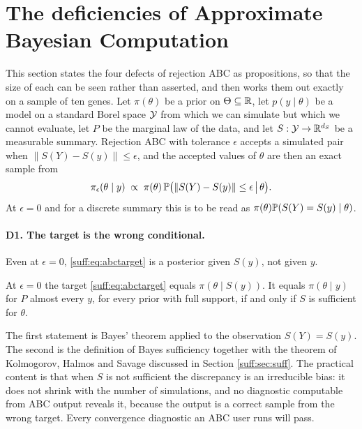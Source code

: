 \section{The deficiencies of Approximate Bayesian Computation}
\label{suff:sec:abc}

This section states the four defects of rejection ABC as propositions, so that the size of
each can be seen rather than asserted, and then works them out exactly on a sample of ten
genes. Let $\pi(\theta)$ be a prior on $\Theta\subseteq\mathbb{R}$, let $p(y\mid\theta)$ be a model on a
standard Borel space $\mathcal{Y}$ from which we can simulate but which we cannot evaluate, let $P$ be the marginal law of the data, and let
$S:\mathcal{Y}\to\mathbb{R}^{d_S}$ be a measurable summary. Rejection ABC with tolerance $\epsilon$ accepts
a simulated pair when $\|S(Y)-S(y)\|\le\epsilon$, and the accepted values of $\theta$ are
then an exact sample from
\begin{equation}
\pi_\epsilon(\theta\mid y) \;\propto\; \pi(\theta)\,
\mathbb{P}\big(\|S(Y)-S(y)\|\le\epsilon \,\big|\, \theta\big).
\label{suff:eq:abctarget}
\end{equation}
At $\epsilon=0$ and for a discrete summary this is to be read as
$\pi(\theta)\mathbb{P}(S(Y)=S(y)\mid\theta)$.

\paragraph{D1. The target is the wrong conditional.} Even at $\epsilon=0$,
\eqref{suff:eq:abctarget} is a posterior given $S(y)$, not given $y$.

\begin{proposition}
\label{suff:prop:d1}
At $\epsilon=0$ the target \eqref{suff:eq:abctarget} equals $\pi(\theta\mid S(y))$. It equals
$\pi(\theta\mid y)$ for $P$ almost every $y$, for every prior with full support, if and only
if $S$ is sufficient for $\theta$.
\end{proposition}

The first statement is Bayes' theorem applied to the observation $S(Y)=S(y)$. The second is
the definition of Bayes sufficiency together with the theorem of Kolmogorov, Halmos and
Savage discussed in Section \ref{suff:sec:suff}. The practical content is that when $S$ is not
sufficient the discrepancy is an irreducible bias: it does not shrink with the number of
simulations, and no diagnostic computable from ABC output reveals it, because the output is a
correct sample from the wrong target. Every convergence diagnostic an ABC user runs will pass.

